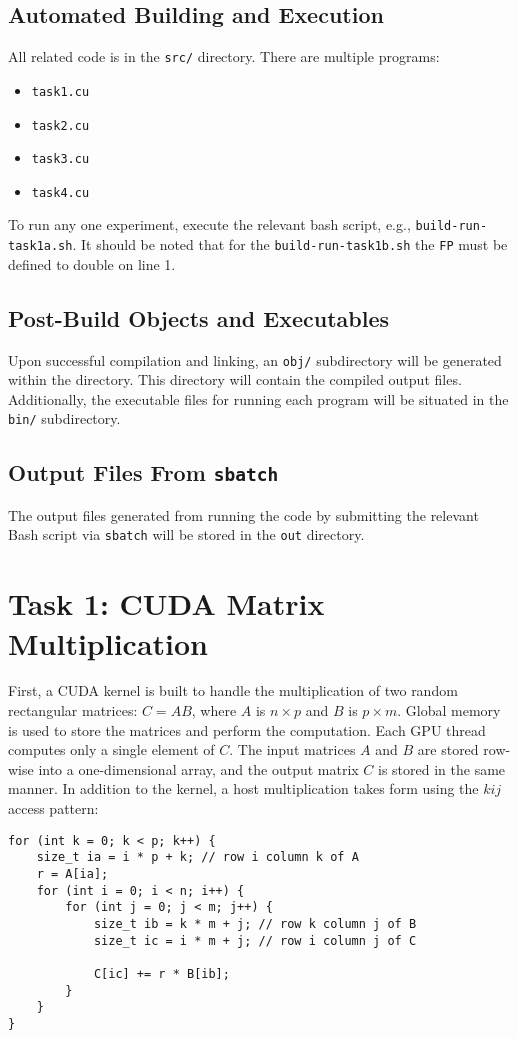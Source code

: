 \documentclass{article}
\begin{document}
\subsection{Automated Building and Execution}
All related code is in the \texttt{src/} directory.
There are multiple programs: 
\begin{multicols}{2}
    \begin{itemize}
        \item \texttt{task1.cu}
        \item \texttt{task2.cu}
        \item \texttt{task3.cu}
        \item \texttt{task4.cu}
    \end{itemize}
\end{multicols}
\noindent To run any one experiment, execute the relevant bash script, e.g., \texttt{build-run-task1a.sh}. It should be 
noted that for the \texttt{build-run-task1b.sh} the \texttt{FP} must be defined to double on line 1.

\subsection{Post-Build Objects and Executables}
Upon successful compilation and linking, an \texttt{obj/} subdirectory will be generated within the directory. 
This directory will contain the compiled output files. Additionally, the executable files for running each program will be 
situated in the \texttt{bin/} subdirectory.

\subsection{Output Files From \texttt{sbatch}}
The output files generated from running the code by submitting the relevant Bash script via \texttt{sbatch} will be 
stored in the \texttt{out} directory. 

\section{Task 1: CUDA Matrix Multiplication}
First, a CUDA kernel is built to handle the multiplication of two 
random rectangular matrices: $C = AB$, where $A$ is $n \times p$ and $B$ is $p \times m$. 
Global memory is used to store the matrices and 
perform the computation. Each GPU thread computes only a single element of $C$. 
The input matrices $A$ and $B$ are stored row-wise into a one-dimensional array, 
and the output matrix $C$ is stored in the same manner. In addition to the kernel, a host multiplication takes form using the $kij$ access pattern:
\begin{lstlisting}
for (int k = 0; k < p; k++) {
    size_t ia = i * p + k; // row i column k of A
    r = A[ia];
    for (int i = 0; i < n; i++) {
        for (int j = 0; j < m; j++) {
            size_t ib = k * m + j; // row k column j of B
            size_t ic = i * m + j; // row i column j of C

            C[ic] += r * B[ib];
        }
    }
}
\end{lstlisting}
\end{document}
